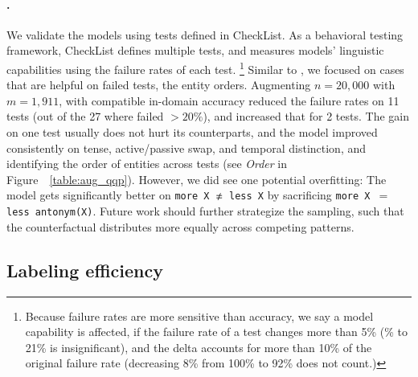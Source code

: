 \paragraph{\qqp.}
We validate the models using tests defined in CheckList.
As a behavioral testing framework, CheckList defines multiple tests, and measures models' linguistic capabilities using the failure rates of each test.
\footnote{Because failure rates are more sensitive than accuracy, we say a model capability is affected, if the failure rate of a test changes more than 5\% (\% to 21\% is insignificant), and the delta accounts for more than 10\% of the original failure rate (\eg decreasing 8\% from 100\% to 92\% does not count.)}
Similar to \nli, we focused on cases that are helpful on failed tests, \eg the entity orders.
Augmenting $n=20,000$ with $m=1,911$, \maug with compatible in-domain accuracy reduced the failure rates on 11 tests (out of the 27 where \mcomp failed $>20\%$), and increased that for 2 tests.
The gain on one test usually does not hurt its counterparts, and the model improved consistently on tense, active/passive swap, and temporal distinction, and identifying the order of entities across tests (see \emph{Order} in Figure~~\ref{table:aug_qqp}). 
However, we did see one potential overfitting: The model gets significantly better on  \texttt{more X $\not\eq$ less X} by sacrificing \texttt{more X $=$ less antonym(X)}.
Future work should further strategize the sampling, such that the counterfactual distributes more equally across competing patterns. 



\subsection{Labeling efficiency}
\label{subsec:label_procedure}



